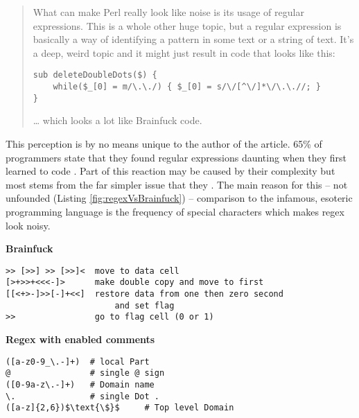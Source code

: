 {\small
\begin{quote}
    What can make Perl really look like noise is its usage of regular expressions. This is a whole other huge topic, but a regular expression is basically a way of identifying a pattern in some text or a string of text. It's a deep, weird topic and it might just result in code that looks like this:

\vspace{1cm}
\begin{minipage}{\linewidth}
\begin{verbatim}
sub deleteDoubleDots($) { 
    while($_[0] = m/\.\./) { $_[0] = s/\/[^\/]*\/\.\.//; } 
}
\end{verbatim}
\end{minipage}

… which looks a lot like Brainfuck code.
\end{quote}

}

This perception is by no means unique to the author of the article. 65\% of programmers state that they found regular expressions daunting when they first learned to code \cite{RegexesAreHard}. Part of this reaction may be caused by their complexity but most stems from the far simpler issue that they  \cite{ViceProgrammingLanguagesProgrammersHate}. The main reason for this  -- not unfounded (Listing \ref{fig:regexVsBrainfuck}) -- comparison to the infamous, esoteric programming language is the frequency of special characters which makes regex look noisy.


{
\hypersetup{citecolor=white}
\begin{listingBox}[title={Comparison of Regex \cite{regexWithComments} and Brainfuck \cite{brainfuckExample}},label=fig:regexVsBrainfuck,width=15.7cm,center]
\begin{flushleft} \textbf{Brainfuck} \end{flushleft}
\vspace{-1em}
\begin{lstlisting}[basicstyle=\ttfamily]
>> [>>] >> [>>]<  move to data cell
[>+>>+<<<-]>      make double copy and move to first
[[<+>-]>>[-]+<<]  restore data from one then zero second 
                      and set flag
>>                go to flag cell (0 or 1)
\end{lstlisting}
\tcblower
\textbf{Regex with enabled comments}
    \begin{lstlisting}[basicstyle=\ttfamily,mathescape=true]
([a-z0-9_\.-]+)  # local Part
@                # single @ sign
([0-9a-z\.-]+)   # Domain name
\.               # single Dot .
([a-z]{2,6})$\text{\$}$     # Top level Domain
\end{lstlisting}
\end{listingBox}
}


